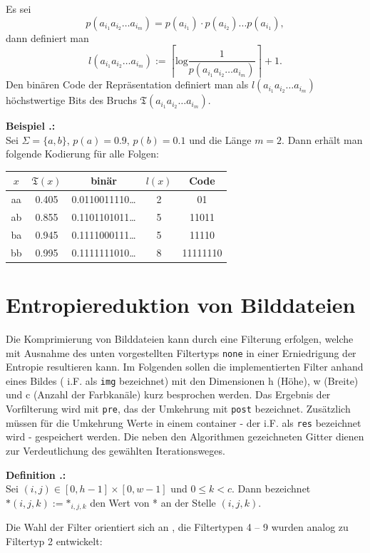 \documentclass[a4paper,12pt]{article}
\newcounter{Definition}
\newcounter{Beispiel}
\newenvironment{Definition}{
\bigskip
        
        \setlength{\parindent}{0pt}
        \addtocounter{Definition}{1}
        \textbf{\textsf{Definition \thesubsection.\theDefinition}:}\\}{
        \nopagebreak
        \vspace{-1.0ex}
        \bigskip
        
}
\newenvironment{Beispiel}{
\medskip
        
        \setlength{\parindent}{0pt}
        \addtocounter{Beispiel}{1}
        \textbf{\textsf{Beispiel \thesubsection.\theBeispiel}:}\\}{
        \nopagebreak
        \vspace{-1.0ex}
        \bigskip
        
}
\begin{document}
\vspace{0.5cm}
\par
Es sei
$$
 p(a_{i_{1}}a_{i_{2}}\ldots a_{i_{m}}) = p(a_{i_{1}})·p(a_{i_{2}})...p(a_{i_{1}}),
$$
dann definiert man 
$$
l(a_{i_{1}}a_{i_{2}}\ldots a_{i_{m}}):=\left\lceil \text{log}\frac{1}{p(a_{i_{1}}a_{i_{2}}\ldots a_{i_{m}}) }\right\rceil + 1.
$$
Den binären Code der Repräsentation definiert man als $l(a_{i_{1}}a_{i_{2}}\ldots a_{i_{m}})$ höchstwertige Bits des Bruchs $\mathfrak{T}(a_{i_{1}}a_{i_{2}}\ldots a_{i_{m}})$. 
\begin{Beispiel}
Sei $\Sigma = \{a,b\}$, $p(a)=0.9$, $p(b)=0.1$ und die Länge $m=2$. Dann erhält man folgende Kodierung für alle Folgen:
\begin{center}
\begin{tabular}{c|c|c|c|c}
$x$ & $\mathfrak{T}(x)$ & binär & $l(x)$  & Code
\\
\hline
aa & 0.405 & 0.0110011110\ldots &  2 & 01
\\
\hline
ab & 0.855 & 0.1101101011\ldots & 5 & 11011
\\
\hline
ba & 0.945 & 0.1111000111\ldots & 5 & 11110
\\
\hline
bb & 0.995 &0.1111111010\ldots & 8 & 11111110
\end{tabular}
\end{center}
\end{Beispiel}
\newpage
\section{Entropiereduktion von Bilddateien}\label{Filter}
Die Komprimierung von Bilddateien kann durch eine Filterung erfolgen, welche mit Ausnahme des unten vorgestellten Filtertyps {\tt{none}} in einer Erniedrigung der Entropie resultieren kann. Im Folgenden sollen die implementierten Filter anhand eines Bildes ( i.F. als {\tt{img}} bezeichnet) mit den Dimensionen  h (Höhe), w (Breite) und c (Anzahl der Farbkanäle) kurz besprochen werden. Das Ergebnis der Vorfilterung wird mit {\tt{pre}}, das der Umkehrung mit {\tt{post}} bezeichnet. Zusätzlich müssen für die Umkehrung  Werte in einem container - der i.F. als {\tt{res}} bezeichnet wird - gespeichert werden. Die neben den Algorithmen gezeichneten Gitter dienen zur Verdeutlichung des gewählten Iterationsweges. 

\begin{Definition}
Sei  $(i,j) \in [0, h-1]\times[0, w-1]$ und $0\leq k < c$.
Dann bezeichnet  $\text{*}(i,j,k):=\text{*}_{i,j,k}$ den Wert von * an der Stelle $(i,j,k)$.
\end{Definition}
Die Wahl der Filter orientiert sich an \cite{png}, die Filtertypen 4 -- 9 wurden analog zu Filtertyp 2 entwickelt:
\end{document}
